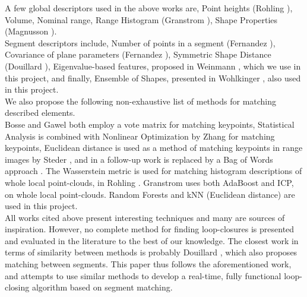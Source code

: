 A few global descriptors used in the above works are,
Point heights (Rohling \cite{rohling2015fast}),
Volume, Nominal range, Range Histogram (Granstrom \cite{granstrom2011learning}),
Shape Properties (Magnusson \cite{magnusson2009automatic}).\\

Segment descriptors include,
Number of points in a segment (Fernandez \cite{fernandez2013fast}),
Covariance of plane parameters (Fernandez \cite{fernandez2016scene}),
Symmetric Shape Distance (Douillard \cite{douillard2012scan}),
Eigenvalue-based features, proposed in Weinmann \cite{weinmann2014semantic}, which we use in this project,
and finally,
Ensemble of Shapes, presented in Wohlkinger \cite{wohlkinger2011ensemble}, also used in this project.\\


We also propose the following non-exhaustive list of methods for matching described elements.\\


Bosse \cite{bosse2013place} and Gawel \cite{Gawel2016} both employ a vote matrix for matching keypoints,
Statistical Analysis is combined with Nonlinear Optimization by Zhang \cite{zhang2014loam} for matching keypoints,
Euclidean distance is used as a method of matching keypoints in range images by Steder \cite{steder2010robust},
and in a follow-up work is replaced by a Bag of Words approach \cite{steder2011place}.
The Wasserstein metric is used for matching histogram descriptions of whole local point-clouds, in Rohling \cite{rohling2015fast}.
Granstrom \cite{granstrom2011learning} uses both AdaBoost and ICP, on whole local point-clouds.
Random Forests and kNN (Euclidean distance) are used in this project.\\

All works cited above present interesting techniques and many are sources of inspiration. However, no complete method for finding loop-closures is presented and evaluated in the literature to the best of our knowledge. The closest work in terms of similarity between methods is probably Douillard \cite{douillard2012scan}, which also proposes matching between segments. This paper thus follows the aforementioned work, and attempts to use similar methods to develop a real-time, fully functional loop-closing algorithm based on segment matching.\\


% 
% 
% 
% 

